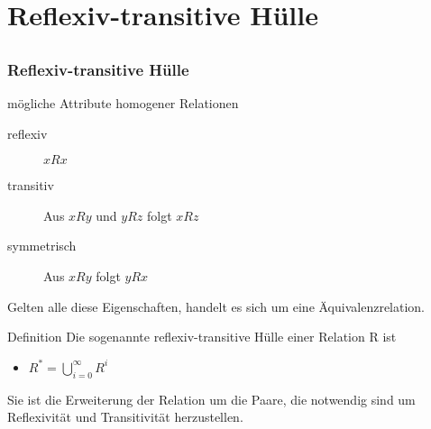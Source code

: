\section[Reflexiv-transitive Hülle]{Reflexiv-transitive Hülle}
\subsection*{}
\begin{frame}
	\frametitle{Reflexiv-transitive Hülle}

	\begin{block}{mögliche Attribute homogener Relationen}
		\begin{description}
			\item[reflexiv] $x R x$
			\item[transitiv] Aus $x R y$ und $y R z$ folgt $x R z$
			\item[symmetrisch] Aus $x R y$ folgt $y R x$
		\end{description} \pause
		Gelten alle diese Eigenschaften, handelt es sich um eine Äquivalenzrelation.
	\end{block}
		\pause
	\begin{block}{Definition}
		Die sogenannte reflexiv-transitive Hülle einer Relation R ist
		\begin{itemize}
			\item $R^* = \bigcup_{i=0}^{\infty} R^i$
		\end{itemize}
	\pause
		Sie ist die Erweiterung der Relation um die Paare, die notwendig sind um Reflexivität und Transitivität herzustellen.
	\end{block}

\end{frame}

